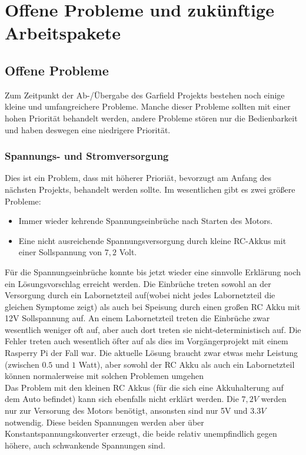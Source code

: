 \chapter{Offene Probleme und zukünftige Arbeitspakete}

\section{Offene Probleme}
Zum Zeitpunkt der Ab-/Übergabe des Garfield Projekts bestehen noch einige kleine und umfangreichere Probleme. Manche dieser Probleme sollten mit einer hohen Priorität behandelt werden, andere Probleme stören nur die Bedienbarkeit und haben deswegen eine niedrigere Priorität.

\subsection{Spannungs- und Stromversorgung}
\label{Problem:Spannung}
Dies ist ein Problem, dass mit höherer Prioriät, bevorzugt am Anfang des nächsten Projekts, behandelt werden sollte. Im wesentlichen gibt es zwei größere Probleme:
\begin{itemize}
	\item Immer wieder kehrende Spannungseinbrüche nach Starten des Motors. 
	\item Eine nicht ausreichende Spannungsversorgung durch kleine RC-Akkus mit einer Sollspannung von $7,2$ Volt.
\end{itemize}

Für die Spannungseinbrüche konnte bis jetzt wieder eine sinnvolle Erklärung noch ein Lösungsvorschlag erreicht werden. Die Einbrüche treten sowohl an der Versorgung durch ein Labornetzteil auf(wobei nicht jedes Labornetzteil die gleichen Symptome zeigt) als auch bei Speisung durch einen großen RC Akku mit 12V Sollspannung auf. An einem Labornetzteil treten die Einbrüche zwar wesentlich weniger oft auf, aber auch dort treten sie nicht-deterministisch auf. Die Fehler treten auch wesentlich öfter auf als dies im Vorgängerprojekt mit einem Rasperry Pi der Fall war. Die aktuelle Lösung braucht zwar etwas mehr Leistung (zwischen $0.5$ und $1$ Watt), aber sowohl der RC Akku als auch ein Labornetzteil können normalerweise mit solchen Problemen umgehen\\

Das Problem mit den kleinen RC Akkus (für die sich eine Akkuhalterung auf dem Auto befindet) kann sich ebenfalls nicht erklärt werden. Die $7,2V$ werden nur zur Versorung des Motors benötigt, ansonsten sind nur 5V und $3.3V$ notwendig. Diese beiden Spannungen werden aber über Konstantspannungskonverter erzeugt, die beide relativ unempfindlich gegen höhere, auch schwankende Spannungen sind.\\

